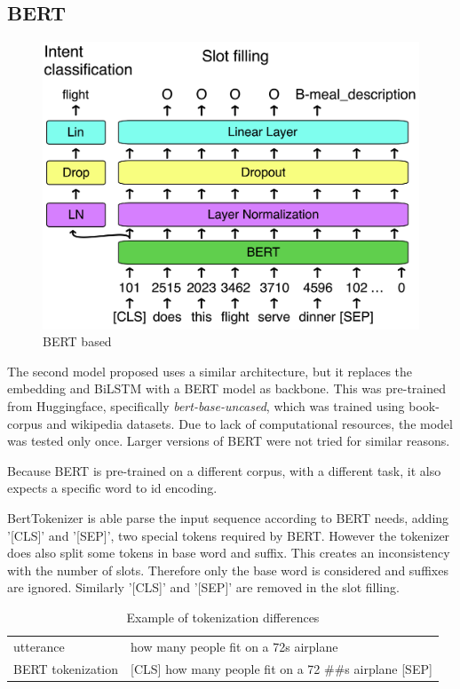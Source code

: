 \documentclass[a4paper]{article}
\begin{document}
\subsection{BERT}
\begin{figure}[h!]
	\centering
	\includegraphics[width=0.8\linewidth]{../assets/BERT}
	\caption{BERT based}
	\label{fig:bert}
\end{figure}
The second model proposed uses a similar architecture, but it replaces the embedding and BiLSTM with a BERT model as backbone. This was pre-trained from Huggingface, specifically \emph{bert-base-uncased}, which was trained using book-corpus and wikipedia datasets.  Due to lack of computational resources, the model was tested only once. Larger versions of BERT were not tried for similar reasons.

Because BERT is pre-trained on a different corpus, with a different task, it also expects a specific word to id encoding.

BertTokenizer is able parse the input sequence according to BERT needs, adding '[CLS]' and '[SEP]', two special tokens required by BERT. However the tokenizer does also split some tokens in base word and suffix. This creates an inconsistency with the number of slots. Therefore only the base word is considered and suffixes are ignored. Similarly '[CLS]' and '[SEP]' are removed in the slot filling. \\




\begin{table}[h!]
	\centering
		\begin{adjustbox}{max width=0.5\textwidth}
				\begin{tabular}{l|l}
					\hline
						utterance & how many people fit on a 72s airplane\\
						BERT tokenization & [CLS] how many people fit on a 72 \#\#s airplane [SEP]\\
						\hline
				\end{tabular}
			\end{adjustbox}
		\vspace*{2mm}
		\caption{Example of tokenization differences}
		\label{tab:tokenizer}
\end{table}
\end{document}
